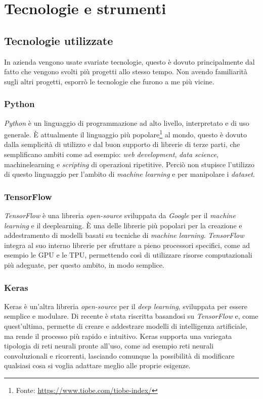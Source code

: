 \section{Tecnologie e strumenti}\label{sec:technologies}

\subsection{Tecnologie utilizzate}\noindent
In azienda vengono usate svariate tecnologie, questo è dovuto principalmente dal fatto che vengono svolti più progetti allo stesso tempo. Non avendo familiarità sugli altri progetti, esporrò le tecnologie che furono a me più vicine.
\subsubsection*{Python}\noindent
\textit{Python} è un linguaggio di programmazione ad alto livello, interpretato e di uso generale.
È attualmente il linguaggio più popolare\footnote{Fonte: \href{https://www.tiobe.com/tiobe-index/}{https://www.tiobe.com/tiobe-index/}} al mondo, questo è dovuto dalla semplicità di utilizzo e dal buon supporto di librerie di terze parti, che semplificano ambiti come ad esempio: \textit{web development}, \textit{data science}, \gls{machinelearning} e \textit{scripting} di operazioni ripetitive.
Perciò non stupisce l'utilizzo di questo linguaggio per l'ambito di \textit{machine learning} e per manipolare i \textit{dataset}.
\subsubsection*{TensorFlow}\noindent
\textit{TensorFlow} è una libreria \textit{open-source} sviluppata da \textit{Google} per il \textit{machine learning} e il \gls{deeplearning}.
È una delle librerie più popolari per la creazione e addestramento di modelli basati su tecniche di \textit{machine learning}.
\textit{TensorFlow} integra al suo interno librerie per sfruttare a pieno processori specifici, come ad esempio le \gls{GPU} e le \gls{TPU}, permettendo così di utilizzare risorse computazionali più adeguate, per questo ambito, in modo semplice.
\subsubsection*{Keras}\noindent
Keras è un'altra libreria \textit{open-source} per il \textit{deep learning}, sviluppata per essere semplice e modulare.
Di recente è stata riscritta basandosi su \textit{TensorFlow} e, come quest'ultima, permette di creare e addestrare modelli di intelligenza artificiale, ma rende il processo più rapido e intuitivo.
Keras supporta una variegata tipologia di reti neurali pronte all'uso, come ad esempio reti neurali convoluzionali e ricorrenti, lasciando comunque la possibilità di modificare qualsiasi cosa si voglia adattare meglio alle proprie esigenze.

